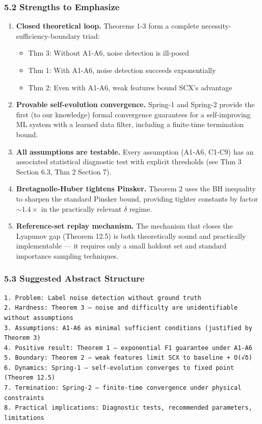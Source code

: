 \documentclass[
  12pt,
]{ctexart}
\providecommand{\tightlist}{%
  \setlength{\itemsep}{0pt}\setlength{\parskip}{0pt}}
\begin{document}
\subsubsection{5.2 Strengths to Emphasize}\label{strengths-to-emphasize}

\begin{enumerate}
\def\labelenumi{\arabic{enumi}.}
\item
  \textbf{Closed theoretical loop.} Theorems 1-3 form a complete
  necessity-sufficiency-boundary triad:

  \begin{itemize}
  \tightlist
  \item
    Thm 3: Without A1-A6, noise detection is ill-posed
  \item
    Thm 1: With A1-A6, noise detection succeeds exponentially
  \item
    Thm 2: Even with A1-A6, weak features bound SCX's advantage
  \end{itemize}
\item
  \textbf{Provable self-evolution convergence.} Spring-1 and Spring-2
  provide the first (to our knowledge) formal convergence guarantees for
  a self-improving ML system with a learned data filter, including a
  finite-time termination bound.
\item
  \textbf{All assumptions are testable.} Every assumption (A1-A6, C1-C9)
  has an associated statistical diagnostic test with explicit thresholds
  (see Thm 3 Section 6.3, Thm 2 Section 7).
\item
  \textbf{Bretagnolle-Huber tightens Pinsker.} Theorem 2 uses the BH
  inequality to sharpen the standard Pinsker bound, providing tighter
  constants by factor \(\sim 1.4\times\) in the practically relevant
  \(\delta\) regime.
\item
  \textbf{Reference-set replay mechanism.} The mechanism that closes the
  Lyapunov gap (Theorem 12.5) is both theoretically sound and
  practically implementable --- it requires only a small holdout set and
  standard importance sampling techniques.
\end{enumerate}

\subsubsection{5.3 Suggested Abstract
Structure}\label{suggested-abstract-structure}

\begin{verbatim}
1. Problem: Label noise detection without ground truth
2. Hardness: Theorem 3 — noise and difficulty are unidentifiable without assumptions
3. Assumptions: A1-A6 as minimal sufficient conditions (justified by Theorem 3)
4. Positive result: Theorem 1 — exponential F1 guarantee under A1-A6
5. Boundary: Theorem 2 — weak features limit SCX to baseline + O(√δ)
6. Dynamics: Spring-1 — self-evolution converges to fixed point (Theorem 12.5)
7. Termination: Spring-2 — finite-time convergence under physical constraints
8. Practical implications: Diagnostic tests, recommended parameters, limitations
\end{verbatim}
\end{document}
